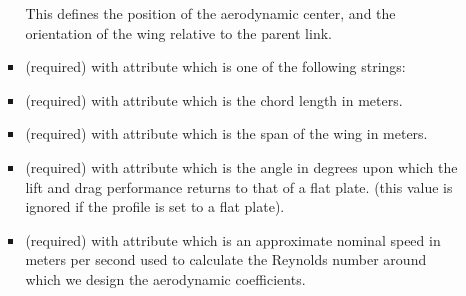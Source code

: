 \begin{itemize}
\begin{itemize}
\begin{itemize}
  This defines the position of the aerodynamic center, and the
  orientation of the wing relative to the parent link.
\item {} (required) with attribute  which is one of
  the following strings:  
\item {} (required) with attribute  which is the chord
  length in meters.  
\item {} (required) with attribute  which is the span of
  the wing in meters.  
\item {} (required) with attribute  which is the
  angle in degrees upon which the lift and drag performance returns to
  that of a flat plate.  (this value is ignored if the profile is set
  to a flat plate).  
\item {} (required) with attribute  which is an
  approximate nominal speed in meters per second used to calculate the
  Reynolds number around which we design the aerodynamic coefficients.
\end{itemize}
\end{itemize}

\end{itemize}
